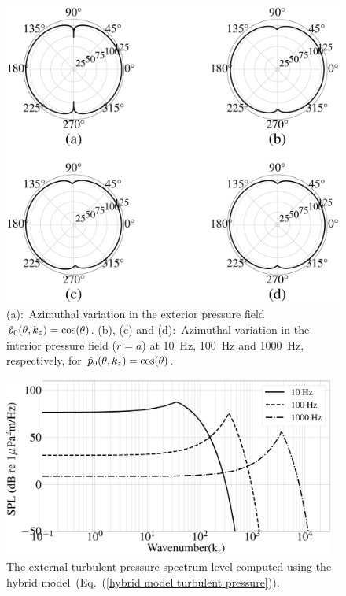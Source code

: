\documentclass[11pt,cleanfoot]{asme2ej}
\begin{document}
\begin{figure}[ht]
    \centerline{
    \includegraphics[width=4.9in]{polarplot_cos_theta.eps}}
    \caption{(a):~Azimuthal variation in the exterior pressure field $\Hat{p}_0(\theta,k_z) =\cos(\theta)$. (b), (c) and (d):~Azimuthal variation in the interior pressure field ($r=a$) at 10~Hz, 100~Hz and 1000~Hz, respectively, for $\Hat{p}_0(\theta,k_z) =\cos(\theta)$.}
    \label{polar plot cos theta}
\end{figure}



\begin{figure}[ht]
    \centerline{
    \includegraphics[width=4.3in]{Comparison_of_turbulent_pressure_spectrum_of_Hybrid.eps}}
    \caption{The external turbulent pressure spectrum level computed using the hybrid model~(Eq.~(\ref{hybrid model turbulent pressure})).}
    \label{Hybrid turbulent pressure spectrum}
\end{figure}
\end{document}
